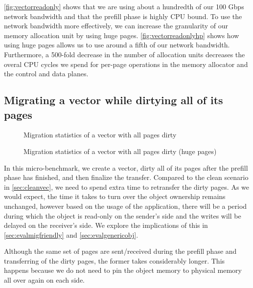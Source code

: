 \autoref{fig:vectorreadonly} shows that we are using about a hundredth of our 100 Gbps
network bandwidth and that the prefill phase is highly CPU bound. To use the
network bandwidth more effectively, we can increase the granularity of our
memory allocation unit by using huge pages. \autoref{fig:vectorreadonlyhp} shows
how using huge pages allows us to use around a fifth of our network bandwidth.
Furthermore, a 500-fold decrease in the number of allocation units decreases
the overal CPU cycles we spend for per-page operations in the memory allocator
and the control and data planes.

\subsection{Migrating a vector while dirtying all of its pages}
\begin{figure}[tp]
    \begin{center}
        
    \end{center}
    \caption{Migration statistics of a vector with all pages dirty}
    \label{fig:vectorwriteall}
\end{figure}

\begin{figure}[tp]
    \begin{center}
        
    \end{center}
    \caption{Migration statistics of a vector with all pages dirty (huge pages)}
    \label{fig:vectorwriteallhp}
\end{figure}

In this micro-benchmark, we create a vector, dirty all of its pages after the
prefill phase has finished, and then finalize the transfer. Compared to the
clean scenario in \autoref{sec:cleanvec}, we need to spend extra time to
retransfer the dirty pages. As we would expect, the time it takes to turn over
the object ownership remains unchanged, however based on the usage of the
application, there will be a period during which the object is read-only on the
sender's side and the writes will be delayed on the receiver's side. We
explore the implications of this in \autoref{sec:evalmigfriendly} and
\autoref{sec:evalgenericobj}.

Although the same set of pages are sent/received during the prefill phase and
transferring of the dirty pages, the former takes considerably longer. This
happens because we do not need to pin the object memory to physical memory all
over again on each side.

